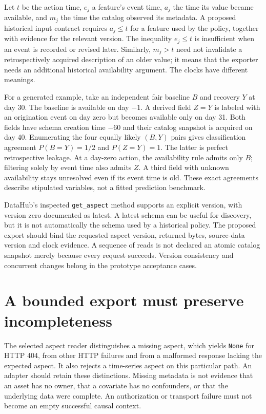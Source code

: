 Let $t$ be the action time, $e_j$ a feature's event time, $a_j$ the time its
value became available, and $m_j$ the time the catalog observed its metadata.
A proposed historical input contract requires $a_j\leq t$ for a feature used
by the policy, together with evidence for the relevant version. The inequality
$e_j\leq t$ is insufficient when an event is recorded or revised later.
Similarly, $m_j>t$ need not invalidate a retrospectively acquired description
of an older value; it means that the exporter needs an additional historical
availability argument. The clocks have different meanings.
\citep{exec16_dh_contract}

For a generated example, take an independent fair baseline $B$ and recovery
$Y$ at day 30. The baseline is available on day $-1$. A derived field $Z=Y$
is labeled with an origination event on day zero but becomes available only
on day 31. Both fields have schema creation time $-60$ and their catalog
snapshot is acquired on day 40. Enumerating the four equally likely $(B,Y)$
pairs gives classification agreement $P(B=Y)=1/2$ and $P(Z=Y)=1$.
The latter is perfect retrospective leakage. At a day-zero action, the
availability rule admits only $B$; filtering solely by event time also admits
$Z$. A third field with unknown availability stays unresolved even if its
event time is old. These exact agreements describe stipulated variables,
not a fitted prediction benchmark. \citep{exec16_dh_exact}

DataHub's inspected \texttt{get\_aspect} method supports an explicit version,
with version zero documented as latest. A latest schema can be useful for
discovery, but it is not automatically the schema used by a historical policy.
The proposed export should bind the requested aspect version, returned bytes,
source-data version and clock evidence. A sequence of reads is not declared
an atomic catalog snapshot merely because every request succeeds. Version
consistency and concurrent changes belong in the prototype acceptance cases.
\citep{exec16_dh_primary,exec16_dh_contract}

\section{A bounded export must preserve incompleteness}

The selected aspect reader distinguishes a missing aspect, which yields
\texttt{None} for HTTP 404, from other HTTP failures and from a malformed
response lacking the expected aspect. It also rejects a time-series aspect
on this particular path. An adapter should retain these distinctions. Missing
metadata is not evidence that an asset has no owner, that a covariate has no
confounders, or that the underlying data were complete. An authorization or
transport failure must not become an empty successful causal context.
\citep{exec16_dh_primary}

